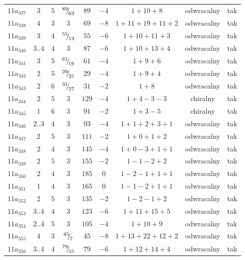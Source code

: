 \begin{longtable}{ccccccccc}
$11a_{337}$ & $3$ & $5$ & ${}^{89}{\mskip -5mu/\mskip -3mu}_{63}$ & $89$ & $-4$ & $1+10+8$ & odwracalny & tak \\
$11a_{338}$ & $4$ & $3$ & $3$ & $69$ & $-8$ & $1+11+19+11+2$ & odwracalny & tak \\
$11a_{339}$ & $3$ & $4$ & ${}^{55}{\mskip -5mu/\mskip -3mu}_{13}$ & $55$ & $-6$ & $1+10+11+3$ & odwracalny & tak \\
$11a_{340}$ & $3..4$ & $4$ & $3$ & $87$ & $-6$ & $1+10+13+4$ & odwracalny & tak \\
$11a_{341}$ & $3$ & $5$ & ${}^{61}{\mskip -5mu/\mskip -3mu}_{19}$ & $61$ & $-4$ & $1+9+6$ & odwracalny & tak \\
$11a_{342}$ & $2$ & $5$ & ${}^{29}{\mskip -5mu/\mskip -3mu}_{25}$ & $29$ & $-4$ & $1+9+4$ & odwracalny & tak \\
$11a_{343}$ & $2$ & $6$ & ${}^{31}{\mskip -5mu/\mskip -3mu}_{27}$ & $31$ & $-2$ & $1+8$ & odwracalny & tak \\
$11a_{344}$ & $2$ & $5$ & $3$ & $129$ & $-4$ & $1+4-3-3$ & chiralny & tak \\
$11a_{345}$ & $1$ & $6$ & $3$ & $91$ & $-2$ & $1+3-5$ & chiralny & tak \\
$11a_{346}$ & $2..3$ & $4$ & $3$ & $93$ & $-4$ & $1+1+2+3+1$ & odwracalny & tak \\
$11a_{347}$ & $2$ & $5$ & $3$ & $111$ & $-2$ & $1+0+1+2$ & odwracalny & tak \\
$11a_{348}$ & $2$ & $4$ & $3$ & $145$ & $-4$ & $1+0-3+1+1$ & odwracalny & tak \\
$11a_{349}$ & $2$ & $5$ & $3$ & $155$ & $-2$ & $1-1-2+2$ & odwracalny & tak \\
$11a_{350}$ & $2$ & $4$ & $3$ & $185$ & $0$ & $1-2-1+1+1$ & odwracalny & tak \\
$11a_{351}$ & $1$ & $4$ & $3$ & $165$ & $0$ & $1-1-2+1+1$ & odwracalny & tak \\
$11a_{352}$ & $2$ & $5$ & $3$ & $135$ & $-2$ & $1-2-1+2$ & odwracalny & tak \\
$11a_{353}$ & $3..4$ & $4$ & $3$ & $123$ & $-6$ & $1+11+15+5$ & odwracalny & tak \\
$11a_{354}$ & $2..4$ & $5$ & $3$ & $105$ & $-4$ & $1+10+9$ & odwracalny & tak \\
$11a_{355}$ & $4$ & $3$ & ${}^{45}{\mskip -5mu/\mskip -3mu}_{7}$ & $45$ & $-8$ & $1+13+22+12+2$ & odwracalny & tak \\
$11a_{356}$ & $3..4$ & $4$ & ${}^{79}{\mskip -5mu/\mskip -3mu}_{55}$ & $79$ & $-6$ & $1+12+14+4$ & odwracalny & tak \\

\end{longtable}
